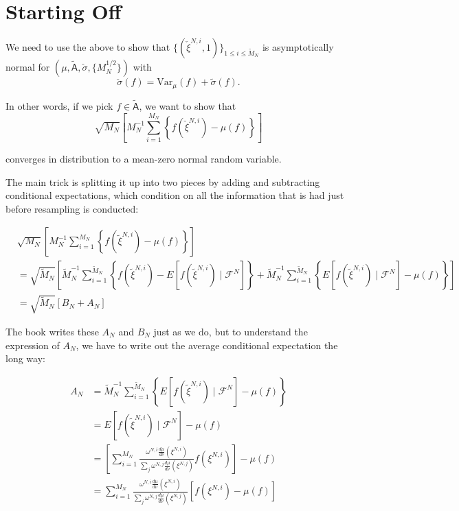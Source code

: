 \documentclass{article}
\begin{document}
\section{Starting Off}

We need to use the above to show that 
$\{ ( \check{\xi}^{N,i}, 1 )\}_{1 \le i \le \tilde{M}_N}$ is asymptotically normal for $(\mu, \tilde{\mathsf{A}}, \check{\sigma}, \{M_N^{1/2}\})$ with 
$$
\check{\sigma}(f) = 
\text{Var}_{\mu}(f) + \tilde{\sigma}(f) .
$$



In other words, if we pick $f\in \tilde{\mathsf{A}}$, we want to show that 
$$
\sqrt{M_N} \left[ M_N^{-1}\sum_{i=1}^{M_N} \left\{  f(\check{\xi}^{N,i}) - \mu(f) \right\}    \right]
$$

converges in distribution to a mean-zero normal random variable. 

The main trick is splitting it up into two pieces by adding and subtracting conditional expectations, which condition on all the information that is had just before resampling is conducted:

\begin{align*}
&\sqrt{M_N} \left[ M_N^{-1}\sum_{i=1}^{M_N} \left\{  f(\tilde{\xi}^{N,i}) - \mu(f) \right\}    \right] \\
&= \sqrt{\tilde{M}_N} \left[ \tilde{M}_N^{-1} \sum_{i=1}^{\tilde{M}_N} \left\{  f(\tilde{\xi}^{N,i}) - E[f(\tilde{\xi}^{N,i}) \mid \mathcal{F}^N] \right\} + \tilde{M}_N^{-1}\sum_{i=1}^{\tilde{M}_N} \left\{  E[f(\tilde{\xi}^{N,i}) \mid \mathcal{F}^N] - \mu(f) \right\}    \right] \\
&= \sqrt{\tilde{M}_N} \left[ B_N + A_N    \right]
\end{align*}

The book writes these $A_N$ and $B_N$ just as we do, but to understand the expression of $A_N$, we have to write out the average conditional expectation the long way:

\begin{align*}
A_N &= \tilde{M}_N^{-1}\sum_{i=1}^{\tilde{M}_N} \left\{  E[f(\tilde{\xi}^{N,i}) \mid \mathcal{F}^N] - \mu(f) \right\} \\
&=   E[f(\tilde{\xi}^{N,i}) \mid \mathcal{F}^N] - \mu(f) \tag{identicalness}\\
&= \left[ \sum_{i=1}^{M_N} \frac{ \omega^{N,i} \frac{d\mu}{d\nu}(\xi^{N,i})  }{ \sum_j \omega^{N,j} \frac{d\mu}{d\nu}(\xi^{N,j})} f(\xi^{N,i}) \right] - \mu(f) \\
&=  \sum_{i=1}^{M_N}  \frac{ \omega^{N,i} \frac{d\mu}{d\nu}(\xi^{N,i})  }{ \sum_j \omega^{N,j} \frac{d\mu}{d\nu}(\xi^{N,j})} \left[f(\xi^{N,i})  - \mu(f) \right]
\end{align*}
\end{document}

